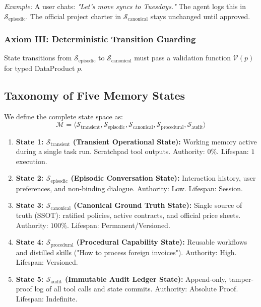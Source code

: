 \documentclass[10pt,journal,compsoc]{IEEEtran}
\begin{document}
\emph{Example:} A user chats: \emph{"Let's move syncs to Tuesdays."} The agent logs this in $\mathcal{S}_{\text{episodic}}$. The official project charter in $\mathcal{S}_{\text{canonical}}$ stays unchanged until approved.

\subsubsection{Axiom III: Deterministic Transition Guarding}
State transitions from $\mathcal{S}_{\text{episodic}}$ to $\mathcal{S}_{\text{canonical}}$ must pass a validation function $\mathcal{V}(p)$ for typed DataProduct $p$.

\subsection{Taxonomy of Five Memory States}

We define the complete state space as:
\begin{equation}
\mathcal{M} = \langle \mathcal{S}_{\text{transient}}, \mathcal{S}_{\text{episodic}}, \mathcal{S}_{\text{canonical}}, \mathcal{S}_{\text{procedural}}, \mathcal{S}_{\text{audit}} \rangle
\end{equation}

\begin{enumerate}
    \item \textbf{State 1: $\mathcal{S}_{\text{transient}}$ (Transient Operational State):} Working memory active during a single task run. Scratchpad tool outputs. Authority: $0\%$. Lifespan: $1$ execution.
    \item \textbf{State 2: $\mathcal{S}_{\text{episodic}}$ (Episodic Conversation State):} Interaction history, user preferences, and non-binding dialogue. Authority: Low. Lifespan: Session.
    \item \textbf{State 3: $\mathcal{S}_{\text{canonical}}$ (Canonical Ground Truth State):} Single source of truth ($\text{SSOT}$): ratified policies, active contracts, and official price sheets. Authority: $100\%$. Lifespan: Permanent/Versioned.
    \item \textbf{State 4: $\mathcal{S}_{\text{procedural}}$ (Procedural Capability State):} Reusable workflows and distilled skills ("How to process foreign invoices"). Authority: High. Lifespan: Versioned.
    \item \textbf{State 5: $\mathcal{S}_{\text{audit}}$ (Immutable Audit Ledger State):} Append-only, tamper-proof log of all tool calls and state commits. Authority: Absolute Proof. Lifespan: Indefinite.
\end{enumerate}
\end{document}
